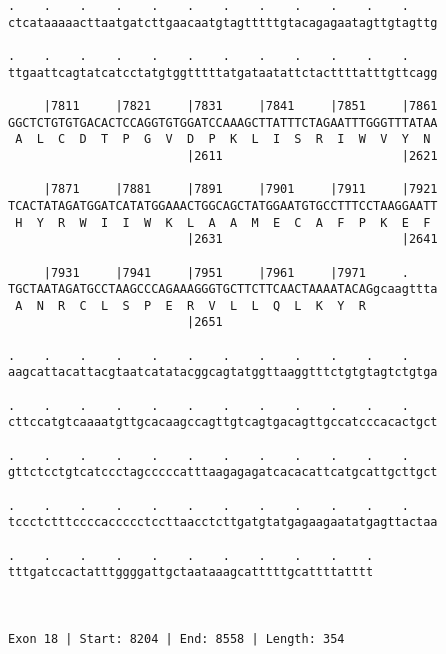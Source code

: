 \documentclass{article}
\begin{document}
\begin{Verbatim}
.    .    .    .    .    .    .    .    .    .    .    .    
ctcataaaaacttaatgatcttgaacaatgtagtttttgtacagagaatagttgtagttg
                                                            
.    .    .    .    .    .    .    .    .    .    .    .    
ttgaattcagtatcatcctatgtggtttttatgataatattctacttttatttgttcagg
                                                            
     |7811     |7821     |7831     |7841     |7851     |7861
GGCTCTGTGTGACACTCCAGGTGTGGATCCAAAGCTTATTTCTAGAATTTGGGTTTATAA
 A  L  C  D  T  P  G  V  D  P  K  L  I  S  R  I  W  V  Y  N 
                         |2611                         |2621
  
     |7871     |7881     |7891     |7901     |7911     |7921
TCACTATAGATGGATCATATGGAAACTGGCAGCTATGGAATGTGCCTTTCCTAAGGAATT
 H  Y  R  W  I  I  W  K  L  A  A  M  E  C  A  F  P  K  E  F 
                         |2631                         |2641
  
     |7931     |7941     |7951     |7961     |7971     .    
TGCTAATAGATGCCTAAGCCCAGAAAGGGTGCTTCTTCAACTAAAATACAGgcaagttta
 A  N  R  C  L  S  P  E  R  V  L  L  Q  L  K  Y  R          
                         |2651                              
  
.    .    .    .    .    .    .    .    .    .    .    .    
aagcattacattacgtaatcatatacggcagtatggttaaggtttctgtgtagtctgtga
                                                            
.    .    .    .    .    .    .    .    .    .    .    .    
cttccatgtcaaaatgttgcacaagccagttgtcagtgacagttgccatcccacactgct
                                                            
.    .    .    .    .    .    .    .    .    .    .    .    
gttctcctgtcatccctagcccccatttaagagagatcacacattcatgcattgcttgct
                                                            
.    .    .    .    .    .    .    .    .    .    .    .    
tccctctttccccaccccctccttaacctcttgatgtatgagaagaatatgagttactaa
                                                            
.    .    .    .    .    .    .    .    .    .    .
tttgatccactatttggggattgctaataaagcatttttgcattttatttt
                                                   
                                                   
 
Exon 18 | Start: 8204 | End: 8558 | Length: 354




\end{Verbatim}
\end{document}
